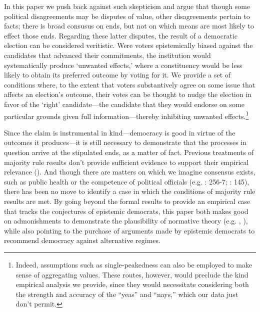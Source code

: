 \documentclass[11pt]{article}
\begin{document}
In this paper we push back against such skepticism and argue that though some political disagreements may be disputes of value, other disagreements pertain to facts; there is broad consusus on ends, but not on which means are most likely to effect those ends. 
Regarding these latter disputes, the result of a democratic election can be considered veritistic.
Were voters epistemically biased against the candidates that advanced their commitments, the institution would systematically produce `unwanted effects,' where a constituency would be less likely to obtain its preferred outcome by voting for it. We provide a set of conditions where, to the extent that voters substantively agree on some issue that affects an election's outcome, their votes can be thought to nudge the election in favor of the `right' candidate---the candidate that they would endorse on some particular grounds given full information---thereby inhibiting unwanted effects.\footnote{Indeed, assumptions such as single-peakedness can also be employed to  make sense of aggregating values. These routes, however, would preclude the kind empirical analysis we provide, since they would necessitate considering both the strength and accuracy of the ``yeas'' and ``nays,'' which our data just don't permit.} 

Since the claim is instrumental in kind---democracy is good in virtue of the outcomes it produces---it is still necessary to demonstrate that the processes in question arrive at the stipulated ends, as a matter of fact. Previous treatments of majority rule results don't provide sufficient evidence to support their empirical relevance  
(\cite{schwartzberg2015epistemic}). And though there are matters on which we imagine consensus exists, such as public health or the competence of political officials (e.g. \cite{Page2007}: 256-7; \cite{Landemore13}: 145), there has been no move to identify a case in which the conditions of majority rule results are met. By going beyond the formal results to provide an empirical case that tracks the conjectures of epistemic democrats, this paper both makes good on admonishments to demonstrate the plausibility of normative theory (e.g. \cite{rehfeld2010offensive}, \cite{wiens2015against}), while also pointing to the purchase of arguments made by epistemic democrats to recommend democracy against alternative regimes.
\end{document}
